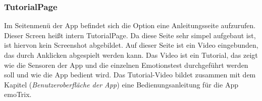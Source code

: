 \subsubsection{TutorialPage}
Im Seitenmenü der App befindet sich die Option eine Anleitungsseite aufzurufen. Dieser Screen heißt intern TutorialPage. Da diese Seite sehr simpel aufgebaut ist, ist hiervon kein Screenshot abgebildet. \newline
Auf dieser Seite ist ein Video eingebunden, das durch Anklicken abgespielt werden kann. Das Video ist ein Tutorial, das zeigt wie die Sensoren der App und die einzelnen Emotionstest durchgeführt werden soll und wie die App bedient wird. Das Tutorial-Video bildet zusammen mit dem Kapitel (\textit{Benutzeroberfläche der App}) eine Bedienungsanleitung für die App emoTrix.